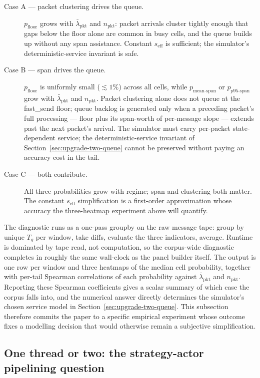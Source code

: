 \documentclass[11pt]{article}
\begin{document}
\begin{description}
\item[Case A --- packet clustering drives the queue.] $p_{\mathrm{floor}}$ grows with $\bar\lambda_{\mathrm{pkt}}$ and $n_{\mathrm{pkt}}$: packet arrivals cluster tightly enough that gaps below the floor alone are common in busy cells, and the queue builds up without any span assistance. Constant $s_{\mathrm{eff}}$ is sufficient; the simulator's deterministic-service invariant is safe.
\item[Case B --- span drives the queue.] $p_{\mathrm{floor}}$ is uniformly small ($\lesssim 1\%$) across all cells, while $p_{\mathrm{mean\text{-}span}}$ or $p_{p95\text{-}\mathrm{span}}$ grow with $\bar\lambda_{\mathrm{pkt}}$ and $n_{\mathrm{pkt}}$. Packet clustering alone does not queue at the fast\_send floor; queue backlog is generated only when a preceding packet's full processing --- floor plus its span-worth of per-message slope --- extends past the next packet's arrival. The simulator must carry per-packet state-dependent service; the deterministic-service invariant of Section~\ref{sec:upgrade-two-queue} cannot be preserved without paying an accuracy cost in the tail.
\item[Case C --- both contribute.] All three probabilities grow with regime; span and clustering both matter. The constant $s_{\mathrm{eff}}$ simplification is a first-order approximation whose accuracy the three-heatmap experiment above will quantify.
\end{description}

The diagnostic runs as a one-pass groupby on the raw message tape: group by unique $T_g$ per window, take diffs, evaluate the three indicators, average. Runtime is dominated by tape read, not computation, so the corpus-wide diagnostic completes in roughly the same wall-clock as the panel builder itself. The output is one row per window and three heatmaps of the median cell probability, together with per-tail Spearman correlations of each probability against $\bar\lambda_{\mathrm{pkt}}$ and $n_{\mathrm{pkt}}$. Reporting these Spearman coefficients gives a scalar summary of which case the corpus falls into, and the numerical answer directly determines the simulator's chosen service model in Section~\ref{sec:upgrade-two-queue}. This subsection therefore commits the paper to a specific empirical experiment whose outcome fixes a modelling decision that would otherwise remain a subjective simplification.

\subsection{One thread or two: the strategy-actor pipelining question}
\label{sec:upgrade-pipelining}
\end{document}
